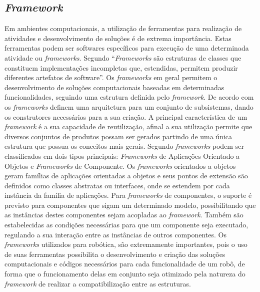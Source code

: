 \subsection{\textit{Framework}}\label{sec:framework}
Em ambientes computacionais, a utilização de ferramentas para realização de atividades e desenvolvimento de soluções é de extrema importância. Estas ferramentas podem ser softwares específicos para execução de uma determinada atividade ou \textit{frameworks}.	
Segundo \cite{tese_framework} “\textit{Frameworks} são estruturas de classes que constituem implementações incompletas que, estendidas, permitem produzir diferentes artefatos de software”. Os \textit{frameworks} em geral permitem o desenvolvimento de soluções computacionais baseadas em determinadas funcionalidades, seguindo uma estrutura definida pelo \textit{framework}. De acordo com \cite{maxwel_framework} os \textit{frameworks} definem uma arquitetura para um conjunto de subsistemas, dando os construtores necessários para a sua criação.
A principal característica de um \textit{framework} é a sua capacidade de reutilização, afinal a sua utilização permite que diversos conjuntos de produtos possam ser gerados partindo de uma única estrutura que possua os conceitos mais gerais.
Segundo \cite{maxwel_framework} \textit{frameworks} podem ser classificados em dois tipos principais: \textit{Frameworks} de Aplicações Orientado a Objetos e \textit{Frameworks} de Componente.
Os \textit{frameworks} orientados a objetos geram famílias de aplicações orientadas a objetos e seus pontos de extensão são definidos como classes abstratas ou interfaces, onde se estendem por cada instância da família de aplicações.
Para \textit{frameworks} de componentes, o suporte é previsto para componentes que sigam um determinado modelo, possibilitando que as instâncias destes componentes sejam acopladas ao \textit{framework}. Também são estabelecidas as condições necessárias para que um componente seja executado, regulando a sua interação entre as instâncias de outros componentes.
Os \textit{frameworks} utilizados para robótica, são extremamente importantes, pois o uso de suas ferramentas possibilita o desenvolvimento e criação das soluções computacionais e códigos necessários para cada funcionalidade de um robô, de forma que o funcionamento delas em conjunto seja otimizado pela natureza do \textit{framework} de realizar a compatibilização entre as estruturas.

